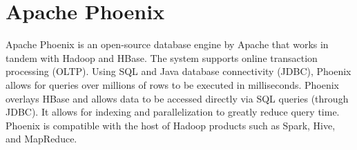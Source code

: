 \section{Apache Phoenix}

Apache Phoenix \cite{hid-sp18-www-526-apache-phoenix} 
is an open-source database engine by Apache that works 
in tandem with Hadoop and HBase. The system supports online 
transaction  processing (OLTP). Using SQL and Java database 
connectivity (JDBC), Phoenix allows for queries over millions of rows 
to be executed in milliseconds. Phoenix overlays HBase and allows 
data to be accessed directly via SQL queries (through JDBC). It allows
for indexing and parallelization to greatly reduce query time. Phoenix
is compatible with the host of Hadoop products such as Spark, Hive, 
and MapReduce.

